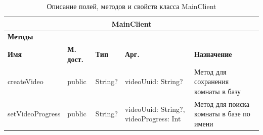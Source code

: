 \documentclass{../includes/TechDoc}
\begin{document}
    \begin{table}[h]
        \caption{\label{tab:class-MainClient-table}Описание полей, методов и свойств класса MainClient}
        \begin{tabularx}{\textwidth}{|l|l|l|l|X|}
            \hline
            \multicolumn{5}{|c|}{MainClient} \\ \hline
            \multicolumn{5}{|l|}{\textbf{Методы}} \\ \hline
            \textbf{Имя}     & \textbf{М. дост.} & \textbf{Тип} & \textbf{Арг.}                          & \textbf{Назначение}                      \\ \hline
            createVideo      & public            & String?      & videoUuid: String?                     & Метод для сохранения комнаты в базу      \\ \hline
            setVideoProgress & public            & String?      & videoUuid: String?, videoProgress: Int & Метод для поиска комнаты в базе по имени \\ \hline
        \end{tabularx}
    \end{table}

    \registrationList
\end{document}
